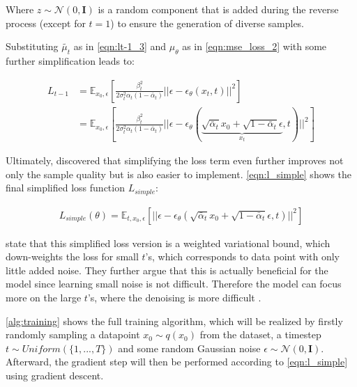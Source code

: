 Where $z\sim\mathcal{N}(0,\textbf{I})$ is a random component that is added during the reverse process (except for $t=1$) to ensure the generation of diverse samples.

Substituting $\tilde{\mu_t}$ as in \autoref{eqn:lt-1_3} and $\mu_\theta$ as in \autoref{eqn:mse_loss_2} with some further simplification leads to:

\begin{equation}
  \begin{align*}
    \label{eqn:eqn:lt-1_4}
    L_{t-1} &= \mathbb{E}_{x_0,\epsilon} \left[  \frac{\beta^2_t}{2\sigma_t^2 \alpha_t (1-\bar{\alpha}_t)} ||\epsilon - \epsilon_\theta(x_t,t)||^2 \right] \\
    &= \mathbb{E}_{x_0,\epsilon} \left[  \frac{\beta^2_t}{2\sigma_t^2 \alpha_t (1-\bar{\alpha}_t)} ||\epsilon - \epsilon_\theta( \underbrace{\sqrt{\bar{\alpha}_t} x_0 + \sqrt{1-\bar{\alpha}_t}\epsilon}_{x_t}, t)||^2 \right]
  \end{align*}
\end{equation}


Ultimately, \textcite[p. 5]{ho2020DenoisingDiffusionProbabilistic} discovered that simplifying the loss term even further improves not only the sample quality but is also easier to implement.
\autoref{eqn:l_simple} shows the final simplified loss function $L_{simple}$:

\begin{equation}
  \begin{align*}
    \label{eqn:l_simple}
    L_{simple}(\theta) = \mathbb{E}_{t, x_0,\epsilon} \left[ ||\epsilon - \epsilon_\theta( \sqrt{\bar{\alpha}_t} x_0 + \sqrt{1-\bar{\alpha}_t}\epsilon, t)||^2 \right]
  \end{align*}
\end{equation}

\textcite{ho2020DenoisingDiffusionProbabilistic} state that this simplified loss version is a weighted variational bound, which down-weights the loss for small $t$'s, which corresponds to data point with only little added noise.
They further argue that this is actually beneficial for the model since learning small noise is not difficult. 
Therefore the model can focus more on the large $t$'s, where the denoising is more difficult \cite{ho2020DenoisingDiffusionProbabilistic}.

\autoref{alg:training} shows the full training algorithm, which will be realized by firstly randomly sampling a datapoint $x_0 \sim q(x_0)$ from the dataset, a timestep $t\sim Uniform(\{1, ..., T\})$ and some random Gaussian noise $\epsilon \sim \mathcal{N}(0, \textbf{I})$.
Afterward, the gradient step will then be performed according to \autoref{eqn:l_simple} using gradient descent.

